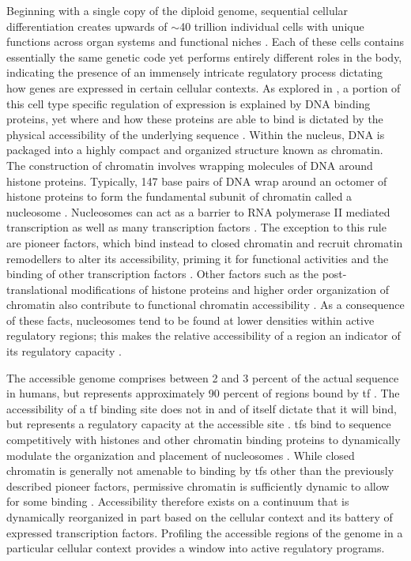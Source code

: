 Beginning with a single copy of the diploid genome, sequential cellular differentiation creates upwards of $\sim$40 trillion individual cells with unique functions across organ systems and functional niches \cite{Quinlan2010}. Each of these cells contains essentially the same genetic code yet performs entirely different roles in the body, indicating the presence of an immensely intricate regulatory process dictating how genes are expressed in certain cellular contexts. As explored in , a portion of this cell type specific regulation of expression is explained by DNA binding proteins, yet where and how these proteins are able to bind is dictated by the physical accessibility of the underlying sequence \cite{Bell2011}. Within the nucleus, DNA is packaged into a highly compact and organized structure known as chromatin. The construction of chromatin involves wrapping molecules of DNA around histone proteins. Typically, 147 base pairs of DNA wrap around an octomer of histone proteins to form the fundamental subunit of chromatin called a nucleosome \cite{Zaret2011}. 
Nucleosomes can act as a barrier to RNA polymerase II mediated transcription as well as many transcription factors \cite{Tsompana2014}. 
The exception to this rule are pioneer factors, which bind instead to closed chromatin and recruit chromatin remodellers to alter its accessibility, priming it for functional activities and the binding of other transcription factors \cite{HW2017,Zaret2011}. 
Other factors such as the post-translational modifications of histone proteins and higher order organization of chromatin also contribute to functional chromatin accessibility \cite{Gates2017}. 
As a consequence of these facts, nucleosomes tend to be found at lower densities within active regulatory regions; this makes the relative accessibility of a region an indicator of its regulatory capacity \cite{Tsompana2014}. 

The accessible genome comprises between 2 and 3 percent of the actual sequence in humans, but represents approximately 90 percent of regions bound by \gls{tf} \cite{Thurman2012}. The accessibility of a \gls{tf} binding site does not in and of itself dictate that it will bind, but represents a regulatory capacity at the accessible site \cite{Tsompana2014}. \Glspl{tf} bind to sequence competitively with histones and other chromatin binding proteins to dynamically modulate the organization and placement of nucleosomes \cite{Calo2013a}. While closed chromatin is generally not amenable to binding by \glspl{tf} other than the previously described pioneer factors, permissive chromatin is sufficiently dynamic to allow for some binding \cite{Bell2011a}. Accessibility therefore exists on a continuum that is dynamically reorganized in part based on the cellular context and its battery of expressed transcription factors.  Profiling the accessible regions of the genome in a particular cellular context provides a window into active regulatory programs. 

